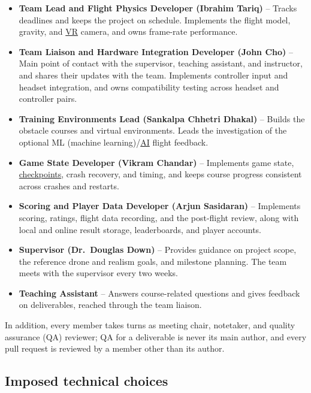 \documentclass[12pt]{article}
\begin{document}
\begin{itemize}
\item \textbf{Team Lead and Flight Physics Developer (Ibrahim Tariq)} --
Tracks deadlines and keeps the project on schedule. Implements the flight
model, gravity, and \hyperlink{glos:VR}{VR} camera, and owns frame-rate performance.
\item \textbf{Team Liaison and Hardware Integration Developer (John Cho)} --
Main point of contact with the supervisor, teaching assistant, and
instructor, and shares their updates with the team. Implements controller
input and headset integration, and owns compatibility testing across headset
and controller pairs.
\item \textbf{Training Environments Lead (Sankalpa Chhetri Dhakal)} -- Builds
the obstacle courses and virtual environments. Leads the investigation of the
optional ML (machine learning)/\hyperlink{glos:AI}{AI} flight feedback.
\item \textbf{Game State Developer (Vikram Chandar)} -- Implements game state,
\hyperlink{glos:Checkpoint}{checkpoints}, crash recovery, and timing, and keeps course progress
consistent across crashes and restarts.
\item \textbf{Scoring and Player Data Developer (Arjun Sasidaran)} --
Implements scoring, ratings, flight data recording, and the post-flight
review, along with local and online result storage, leaderboards, and player
accounts.
\item \textbf{Supervisor (Dr.\ Douglas Down)} -- Provides guidance on project
scope, the reference drone and realism goals, and milestone planning. The
team meets with the supervisor every two weeks.
\item \textbf{Teaching Assistant} -- Answers course-related questions and
gives feedback on deliverables, reached through the team liaison.
\end{itemize}

In addition, every member takes turns as meeting chair, notetaker, and
quality assurance (QA) reviewer; QA for a deliverable is never its main
author, and every pull request is reviewed by a member other than its
author.

\subsection{Imposed technical choices}\label{p2}
\end{document}
